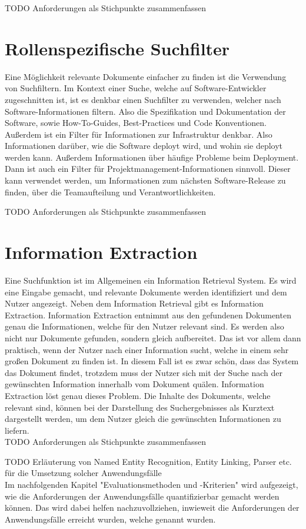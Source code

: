 TODO Anforderungen als Stichpunkte zusammenfassen

\section{Rollenspezifische Suchfilter}
\label{chap:rollenspezifische-suchfilter}
Eine Möglichkeit relevante Dokumente einfacher zu finden ist die Verwendung von Suchfiltern.
Im Kontext einer Suche, welche auf Software-Entwickler zugeschnitten ist, ist es denkbar einen Suchfilter zu verwenden, welcher nach Software-Informationen filtern.
Also die Spezifikation und Dokumentation der Software, sowie How-To-Guides, Best-Practices und Code Konventionen.
Außerdem ist ein Filter für Informationen zur Infrastruktur denkbar. Also Informationen darüber, wie die Software deployt wird, und wohin sie deployt werden kann.
Außerdem Informationen über häufige Probleme beim Deployment.
Dann ist auch ein Filter für Projektmanagement-Informationen sinnvoll.
Dieser kann verwendet werden, um Informationen zum nächsten Software-Release zu finden, über die Teamaufteilung und Verantwortlichkeiten.

TODO Anforderungen als Stichpunkte zusammenfassen

\section{Information Extraction}
Eine Suchfunktion ist im Allgemeinen ein Information Retrieval System.
Es wird eine Eingabe gemacht, und relevante Dokumente werden identifiziert und dem Nutzer angezeigt.
Neben dem Information Retrieval gibt es Information Extraction.
Information Extraction entnimmt aus den gefundenen Dokumenten genau die Informationen, welche für den Nutzer relevant sind.
Es werden also nicht nur Dokumente gefunden, sondern gleich aufbereitet.
Das ist vor allem dann praktisch, wenn der Nutzer nach einer Information sucht, welche in einem sehr großen Dokument zu finden ist.
In diesem Fall ist es zwar schön, dass das System das Dokument findet, trotzdem muss der Nutzer sich mit der Suche nach der gewünschten Information innerhalb vom Dokument quälen.
Information Extraction löst genau dieses Problem.
Die Inhalte des Dokuments, welche relevant sind, können bei der Darstellung des Suchergebnisses als Kurztext dargestellt werden, um dem Nutzer gleich die gewünschten Informationen zu liefern.\\

TODO Anforderungen als Stichpunkte zusammenfassen

TODO Erläuterung von Named Entity Recognition, Entity Linking, Parser etc. für die Umsetzung solcher Anwendungsfälle\\

Im nachfolgenden Kapitel "Evaluationsmethoden und -Kriterien" wird aufgezeigt, wie die Anforderungen der Anwendungsfälle quantifizierbar gemacht werden können.
Das wird dabei helfen nachzuvollziehen, inwieweit die Anforderungen der Anwendungsfälle erreicht wurden, welche genannt wurden.
